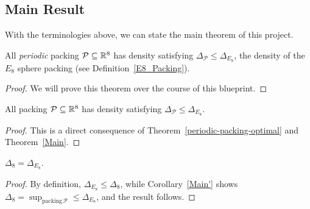 \subsection{Main Result}

With the terminologies above, we can state the main theorem of this project.

\begin{theorem}\label{Main}
  All \emph{periodic} packing $\mathcal{P} \subseteq \mathbb{R}^8$ has density satisfying $\Delta_{\mathcal{P}} \leq \Delta_{E_8}$, the density of the $E_8$ sphere packing (see Definition~\ref{E8_Packing}).
\end{theorem}
\begin{proof}
  We will prove this theorem over the course of this blueprint.
\end{proof}

\begin{corollary}\label{Main'}
  All packing $\mathcal{P} \subseteq \mathbb{R}^8$ has density satisfying $\Delta_{\mathcal{P}} \leq \Delta_{E_8}$.
\end{corollary}
\begin{proof}
  This is a direct consequence of Theorem~\ref{periodic-packing-optimal} and Theorem~\ref{Main}.
\end{proof}

\begin{corollary}\label{Main''}
  $\Delta_8 = \Delta_{E_8}$.
\end{corollary}
\begin{proof}
  By definition, $\Delta_{E_8} \leq \Delta_8$, while Corollary~\ref{Main'} shows $\Delta_8 = \sup_{\mathrm{packing} \, \mathcal{P}} \leq \Delta_{E_8}$, and the result follows.
\end{proof}
